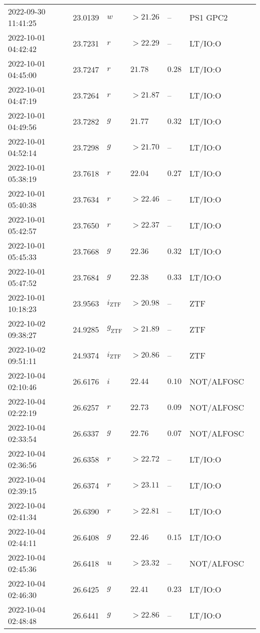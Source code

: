 \documentclass{nature_plusfigure}
\begin{document}
\begin{supplement}
\begin{center}
\begin{longtable}{lllllll}
2022-09-30 11:41:25 & 23.0139 & $w$ & $>21.26$ & -- & PS1 GPC2 &  \\ 
2022-10-01 04:42:42 & 23.7231 & $r$ & $>22.29$ & -- & LT/IO:O &  \\ 
2022-10-01 04:45:00 & 23.7247 & $r$ & $21.78$ & $0.28$ & LT/IO:O &  \\ 
2022-10-01 04:47:19 & 23.7264 & $r$ & $>21.87$ & -- & LT/IO:O &  \\ 
2022-10-01 04:49:56 & 23.7282 & $g$ & $21.77$ & $0.32$ & LT/IO:O &  \\ 
2022-10-01 04:52:14 & 23.7298 & $g$ & $>21.70$ & -- & LT/IO:O &  \\ 
2022-10-01 05:38:19 & 23.7618 & $r$ & $22.04$ & $0.27$ & LT/IO:O &  \\ 
2022-10-01 05:40:38 & 23.7634 & $r$ & $>22.46$ & -- & LT/IO:O &  \\ 
2022-10-01 05:42:57 & 23.7650 & $r$ & $>22.37$ & -- & LT/IO:O &  \\ 
2022-10-01 05:45:33 & 23.7668 & $g$ & $22.36$ & $0.32$ & LT/IO:O &  \\ 
2022-10-01 05:47:52 & 23.7684 & $g$ & $22.38$ & $0.33$ & LT/IO:O &  \\ 
2022-10-01 10:18:23 & 23.9563 & ${i}_\mathrm{ZTF}$ & $>20.98$ & -- & ZTF &  \\ 
2022-10-02 09:38:27 & 24.9285 & ${g}_\mathrm{ZTF}$ & $>21.89$ & -- & ZTF &  \\ 
2022-10-02 09:51:11 & 24.9374 & ${i}_\mathrm{ZTF}$ & $>20.86$ & -- & ZTF &  \\ 
2022-10-04 02:10:46 & 26.6176 & $i$ & $22.44$ & $0.10$ & NOT/ALFOSC &  \\ 
2022-10-04 02:22:19 & 26.6257 & $r$ & $22.73$ & $0.09$ & NOT/ALFOSC &  \\ 
2022-10-04 02:33:54 & 26.6337 & $g$ & $22.76$ & $0.07$ & NOT/ALFOSC &  \\ 
2022-10-04 02:36:56 & 26.6358 & $r$ & $>22.72$ & -- & LT/IO:O &  \\ 
2022-10-04 02:39:15 & 26.6374 & $r$ & $>23.11$ & -- & LT/IO:O &  \\ 
2022-10-04 02:41:34 & 26.6390 & $r$ & $>22.81$ & -- & LT/IO:O &  \\ 
2022-10-04 02:44:11 & 26.6408 & $g$ & $22.46$ & $0.15$ & LT/IO:O &  \\ 
2022-10-04 02:45:36 & 26.6418 & $u$ & $>23.32$ & -- & NOT/ALFOSC &  \\ 
2022-10-04 02:46:30 & 26.6425 & $g$ & $22.41$ & $0.23$ & LT/IO:O &  \\ 
2022-10-04 02:48:48 & 26.6441 & $g$ & $>22.86$ & -- & LT/IO:O &  \\ 

\end{longtable}
\end{center}
\end{supplement}
\end{document}
